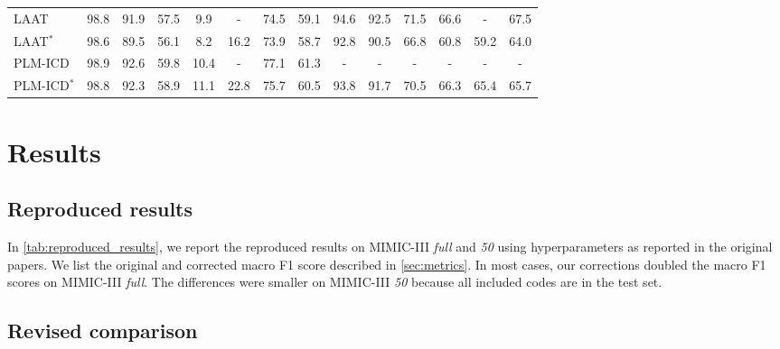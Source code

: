 {\begin{sidewaystable}[t]
{\begin{tabular}{l  cc  ccc  cc  cc  ccc  c}
        \hline
        LAAT  &  98.8 &  91.9 &  57.5 & 9.9 & - &  74.5 &  59.1  &  94.6 &  92.5 &  71.5 &  66.6 & - &  67.5 \\
        LAAT$^*$ & 98.6 & 89.5 & 56.1 & 8.2 & 16.2 & 73.9 & 58.7 & 92.8 & 90.5 & 66.8 & 60.8 & 59.2 & 64.0  \\
        \hline
        PLM-ICD  &  98.9 & 92.6 &  59.8 & 10.4 & - &  77.1 &  61.3  & - & - & - & - & - & -  \\
        PLM-ICD$^*$ & 98.8 & 92.3 & 58.9 & 11.1 & 22.8 & 75.7 & 60.5 & 93.8 & 91.7 & 70.5 & 66.3 & 65.4 & 65.7 \\
        \bottomrule
    \end{tabular}%
    }
\end{sidewaystable}

\section{Results}
\subsection{Reproduced results}


In \cref{tab:reproduced_results}, we report the reproduced results on MIMIC-III \textit{full} and \textit{50} using hyperparameters as reported in the original papers. We list the original and corrected macro F1 score described in \cref{sec:metrics}. In most cases, our corrections doubled the macro F1 scores on MIMIC-III \textit{full}. The differences were smaller on MIMIC-III \textit{50} because all included codes are in the test set.


\subsection{Revised comparison}

}
